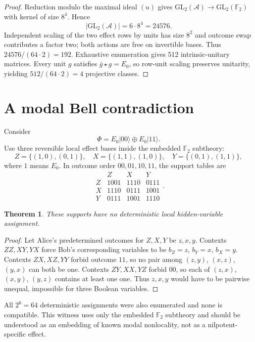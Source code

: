 \documentclass[11pt]{article}
\newtheorem{theorem}{Theorem}
\newcommand{\A}{\mathcal A}
\newcommand{\F}{\mathbb F}
\newcommand{\xorp}{\mathbin{\oplus}}
\newcommand{\starp}{\mathbin{\star}}
\newcommand{\ket}[1]{\lvert #1\rangle}
\begin{document}
\begin{proof}
Reduction modulo the maximal ideal $(u)$ gives
$\mathrm{GL}_2(\A)\to\mathrm{GL}_2(\F_2)$ with kernel of size $8^4$.
Hence
\[
|\mathrm{GL}_2(\A)|=6\cdot 8^4=24576.
\]
Independent scaling of the two effect rows by units has size $8^2$ and
outcome swap contributes a factor two; both actions are free on invertible
bases.  Thus $24576/(64\cdot2)=192$.  Exhaustive enumeration gives 512
intrinsic-unitary matrices.  Every unit $g$ satisfies
$\bar g\starp g=E_0$, so row-unit scaling preserves unitarity, yielding
$512/(64\cdot2)=4$ projective classes.
\end{proof}

\section{A modal Bell contradiction}

Consider
\[
\Phi=E_0\ket{00}\xorp E_0\ket{11}.
\]
Use three reversible local effect bases inside the embedded $\F_2$ subtheory:
\[
Z=\{(1,0),(0,1)\},\quad
X=\{(1,1),(1,0)\},\quad
Y=\{(0,1),(1,1)\},
\]
where $1$ means $E_0$.  In outcome order $00,01,10,11$, the support tables
are
\[
\begin{array}{c|ccc}
 &Z&X&Y\\\hline
Z&1001&1110&0111\\
X&1110&0111&1001\\
Y&0111&1001&1110
\end{array}.
\]

\begin{theorem}
These supports have no deterministic local hidden-variable assignment.
\end{theorem}

\begin{proof}
Let Alice's predetermined outcomes for $Z,X,Y$ be $z,x,y$.  Contexts
$ZZ,XY,YX$ force Bob's corresponding variables to be
$b_Z=z$, $b_Y=x$, $b_X=y$.  Contexts $ZX,XZ,YY$ forbid outcome $11$, so
no pair among $(z,y)$, $(x,z)$, $(y,x)$ can both be one.  Contexts
$ZY,XX,YZ$ forbid $00$, so each of $(z,x)$, $(x,y)$, $(y,z)$ contains at
least one one.  Thus $z,x,y$ would have to be pairwise unequal, impossible for
three Boolean variables.
\end{proof}

All $2^6=64$ deterministic assignments were also enumerated and none is
compatible.  This witness uses only the embedded $\F_2$ subtheory and should
be understood as an embedding of known modal nonlocality, not as a
nilpotent-specific effect.
\end{document}
